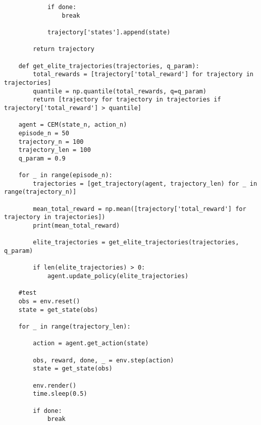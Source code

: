\begin{lstlisting}
			if done:
				break
		
			trajectory['states'].append(state)
		
		return trajectory
	
	def get_elite_trajectories(trajectories, q_param):
		total_rewards = [trajectory['total_reward'] for trajectory in trajectories]
		quantile = np.quantile(total_rewards, q=q_param) 
		return [trajectory for trajectory in trajectories if trajectory['total_reward'] > quantile]
	
	agent = CEM(state_n, action_n)
	episode_n = 50
	trajectory_n = 100
	trajectory_len = 100
	q_param = 0.9
	
	for _ in range(episode_n):
		trajectories = [get_trajectory(agent, trajectory_len) for _ in range(trajectory_n)]
		
		mean_total_reward = np.mean([trajectory['total_reward'] for trajectory in trajectories])
		print(mean_total_reward)
		
		elite_trajectories = get_elite_trajectories(trajectories, q_param)
		
		if len(elite_trajectories) > 0:
			agent.update_policy(elite_trajectories)
	
	#test
	obs = env.reset()
	state = get_state(obs)
	
	for _ in range(trajectory_len):
	
		action = agent.get_action(state)
		
		obs, reward, done, _ = env.step(action)
		state = get_state(obs)
		
		env.render()
		time.sleep(0.5)
		
		if done:
			break
\end{lstlisting}



